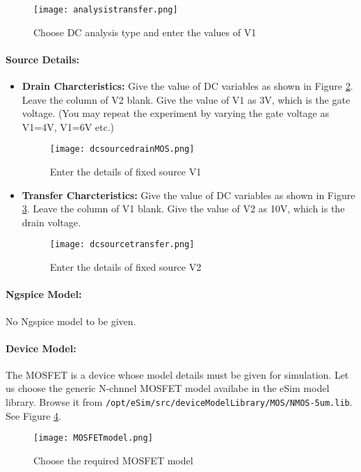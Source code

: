 \begin{figure}[h]
\centering
\texttt{[image: analysistransfer.png]}
\caption{Choose DC analysis type and enter the values of V1}
\label{analysistransferMOS}
\end{figure}
\paragraph{Source Details:} 
\begin{itemize}
\item \textbf{Drain Charcteristics:} Give the value of DC variables as shown in Figure \ref{dcsourcedrainMOS}. Leave the column of V2 blank. Give the value of V1 as 3V, which is the gate voltage. (You may repeat the experiment by varying the gate voltage as V1=4V, V1=6V etc.)
\begin{figure}[h]
\centering
\texttt{[image: dcsourcedrainMOS.png]}
\caption{Enter the details of fixed source V1}
\label{dcsourcedrainMOS}
\end{figure}

\item \textbf{Transfer Charcteristics:} Give the value of DC variables as shown in Figure \ref{dcsourcetransferMOS}. Leave the column of V1 blank. Give the value of V2 as 10V, which is the drain voltage. 
\begin{figure}[h]
\centering
\texttt{[image: dcsourcetransfer.png]}
\caption{Enter the details of fixed source V2}
\label{dcsourcetransferMOS}
\end{figure}

\end{itemize}

\paragraph{Ngspice Model:} No Ngspice model to be given.

\paragraph{Device Model:} The MOSFET is a device whose model details must be given for simulation. Let us choose the generic N-chnnel MOSFET model availabe in the eSim model library. Browse it from \texttt{/opt/eSim/src/deviceModelLibrary/MOS/NMOS-5um.lib}. See Figure \ref{MOSFETmodel}.
\begin{figure}[h]
\centering
\texttt{[image: MOSFETmodel.png]}
\caption{Choose the required MOSFET model}
\label{MOSFETmodel}
\end{figure}

